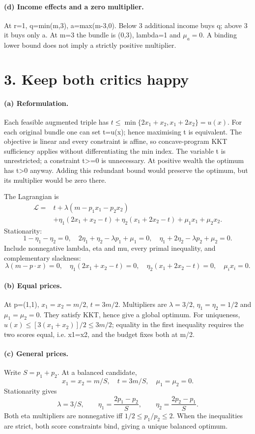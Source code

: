 \documentclass[11pt,a4paper]{article}
\begin{document}
\paragraph{(d) Income effects and a zero multiplier.}
At r=1, q=min(m,3), a=max(m-3,0). Below 3 additional income buys q; above 3 it buys only a. At m=3 the bundle is (0,3), lambda=1 and $\mu_a=0$. A binding lower bound does not imply a strictly positive multiplier.
\clearpage
\section*{3. Keep both critics happy}
\paragraph{(a) Reformulation.}
Each feasible augmented triple has $t\le\min\{2x_1+x_2,x_1+2x_2\}=u(x)$. For each original bundle one can set t=u(x); hence maximising t is equivalent. The objective is linear and every constraint is affine, so concave-program KKT sufficiency applies without differentiating the min index. The variable t is unrestricted; a constraint t>=0 is unnecessary. At positive wealth the optimum has t>0 anyway. Adding this redundant bound would preserve the optimum, but its multiplier would be zero there.

The Lagrangian is
\[
 \begin{split}
 \mathcal L={}&t+\lambda(m-p_1x_1-p_2x_2)\\
 &+\eta_1(2x_1+x_2-t)+\eta_2(x_1+2x_2-t)+\mu_1x_1+\mu_2x_2.
 \end{split}
\]
Stationarity:
\[
 1-\eta_1-\eta_2=0,\quad
 2\eta_1+\eta_2-\lambda p_1+\mu_1=0,\quad
 \eta_1+2\eta_2-\lambda p_2+\mu_2=0.
\]
Include nonnegative lambda, eta and mu, every primal inequality, and complementary slackness:
\[
 \lambda(m-p\cdot x)=0,\quad
 \eta_1(2x_1+x_2-t)=0,\quad
 \eta_2(x_1+2x_2-t)=0,\quad\mu_ix_i=0.
\]
\paragraph{(b) Equal prices.}
At p=(1,1), $x_1=x_2=m/2$, $t=3m/2$. Multipliers are $\lambda=3/2$, $\eta_1=\eta_2=1/2$ and $\mu_1=\mu_2=0$. They satisfy KKT, hence give a global optimum. For uniqueness, $u(x)\le[3(x_1+x_2)]/2\le3m/2$; equality in the first inequality requires the two scores equal, i.e. x1=x2, and the budget fixes both at m/2.
\paragraph{(c) General prices.}
Write $S=p_1+p_2$. At a balanced candidate,
\[
 x_1=x_2=m/S,\quad t=3m/S,\quad\mu_1=\mu_2=0.
\]
Stationarity gives
\[
 \lambda=3/S,\qquad
 \eta_1=\frac{2p_1-p_2}{S},\qquad
 \eta_2=\frac{2p_2-p_1}{S}.
\]
Both eta multipliers are nonnegative iff $1/2\le p_1/p_2\le2$. When the inequalities are strict, both score constraints bind, giving a unique balanced optimum.
\end{document}
